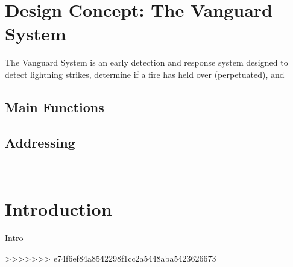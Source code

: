 \documentclass[12pt, letterpaper, titlepage]{article}
\begin{document}




\section{Design Concept: The Vanguard System}
The Vanguard System is an early detection and response system designed to detect lightning strikes, determine if a fire has held over (perpetuated), and
\subsection{Main Functions}

\subsection{Addressing }

\newpage
=======
\section{Introduction} \label{intro}
Intro

>>>>>>> e74f6ef84a8542298f1cc2a5448aba5423626673
\renewcommand{\refname}{\centering Annotated Bibliography}



\end{document}
